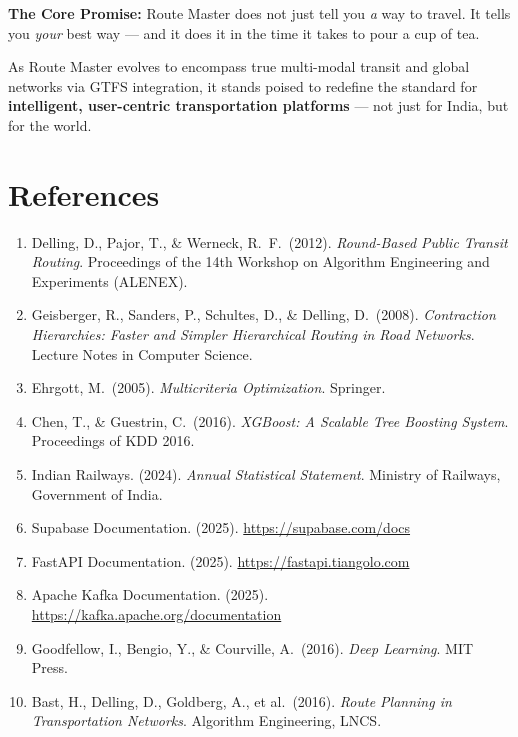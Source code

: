 \documentclass[12pt,a4paper]{report}
\begin{document}
\begin{tcolorbox}[keybox]
\textbf{The Core Promise:} Route Master does not just tell you \textit{a} way to travel. It tells you \textit{your} best way --- and it does it in the time it takes to pour a cup of tea.
\end{tcolorbox}

As Route Master evolves to encompass true multi-modal transit and global networks via GTFS integration, it stands poised to redefine the standard for \textbf{intelligent, user-centric transportation platforms} --- not just for India, but for the world.

\chapter*{References}

\begin{enumerate}[leftmargin=1.5em]
  \item Delling, D., Pajor, T., \& Werneck, R.\ F.\ (2012). \textit{Round-Based Public Transit Routing}. Proceedings of the 14th Workshop on Algorithm Engineering and Experiments (ALENEX).
  \item Geisberger, R., Sanders, P., Schultes, D., \& Delling, D.\ (2008). \textit{Contraction Hierarchies: Faster and Simpler Hierarchical Routing in Road Networks}. Lecture Notes in Computer Science.
  \item Ehrgott, M.\ (2005). \textit{Multicriteria Optimization}. Springer.
  \item Chen, T., \& Guestrin, C.\ (2016). \textit{XGBoost: A Scalable Tree Boosting System}. Proceedings of KDD 2016.
  \item Indian Railways. (2024). \textit{Annual Statistical Statement}. Ministry of Railways, Government of India.
  \item Supabase Documentation. (2025). \url{https://supabase.com/docs}
  \item FastAPI Documentation. (2025). \url{https://fastapi.tiangolo.com}
  \item Apache Kafka Documentation. (2025). \url{https://kafka.apache.org/documentation}
  \item Goodfellow, I., Bengio, Y., \& Courville, A.\ (2016). \textit{Deep Learning}. MIT Press.
  \item Bast, H., Delling, D., Goldberg, A., et al.\ (2016). \textit{Route Planning in Transportation Networks}. Algorithm Engineering, LNCS.
\end{enumerate}
\end{document}
